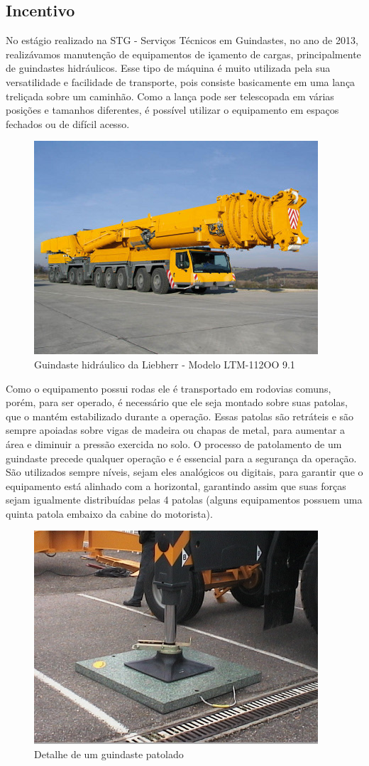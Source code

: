 \documentclass[a4paper,12pt]{article}
\begin{document}
\subsection{Incentivo}

No estágio realizado na STG - Serviços Técnicos em Guindastes, no ano de 2013, realizávamos manutenção de equipamentos de içamento de cargas, principalmente de guindastes hidráulicos. Esse tipo de máquina é muito utilizada pela sua versatilidade e facilidade de transporte, pois consiste basicamente em uma lança treliçada sobre um caminhão. Como a lança pode ser telescopada em várias posições e tamanhos diferentes, é possível utilizar o equipamento em espaços fechados ou de difícil acesso.

\begin{figure}[H]
\centering
\includegraphics[width=.7\textwidth]{img/ltm11200.jpg}
\caption{Guindaste hidráulico da Liebherr - Modelo LTM-112OO 9.1}
\end{figure}

Como o equipamento possui rodas ele é transportado em rodovias comuns, porém, para ser operado, é necessário que ele seja montado sobre suas patolas, que o mantém estabilizado durante a operação. Essas patolas são retráteis e são sempre apoiadas sobre vigas de madeira ou chapas de metal, para aumentar a área e diminuir a pressão exercida no solo. O processo de patolamento de um guindaste precede qualquer operação e é essencial para a segurança da operação. São utilizados sempre níveis, sejam eles analógicos ou digitais, para garantir que o equipamento está alinhado com a horizontal, garantindo assim que suas forças sejam igualmente distribuídas pelas 4 patolas (alguns equipamentos possuem uma quinta patola embaixo da cabine do motorista).

\begin{figure}[H]
\centering
\includegraphics[width=.6\textwidth]{img/patolamento.jpg}
\caption{Detalhe de um guindaste patolado}
\end{figure}
\end{document}
